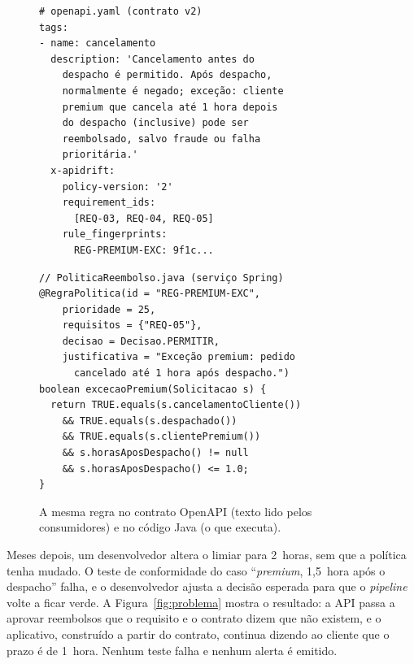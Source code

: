\documentclass[12pt]{article}
\begin{document}
\begin{figure}[!ht]
\centering
\begin{minipage}{0.48\linewidth}
\begin{lstlisting}
# openapi.yaml (contrato v2)
tags:
- name: cancelamento
  description: 'Cancelamento antes do
    despacho é permitido. Após despacho,
    normalmente é negado; exceção: cliente
    premium que cancela até 1 hora depois
    do despacho (inclusive) pode ser
    reembolsado, salvo fraude ou falha
    prioritária.'
  x-apidrift:
    policy-version: '2'
    requirement_ids:
      [REQ-03, REQ-04, REQ-05]
    rule_fingerprints:
      REG-PREMIUM-EXC: 9f1c...
\end{lstlisting}
\end{minipage}\hfill
\begin{minipage}{0.5\linewidth}
\begin{lstlisting}
// PoliticaReembolso.java (serviço Spring)
@RegraPolitica(id = "REG-PREMIUM-EXC",
    prioridade = 25,
    requisitos = {"REQ-05"},
    decisao = Decisao.PERMITIR,
    justificativa = "Exceção premium: pedido
      cancelado até 1 hora após despacho.")
boolean excecaoPremium(Solicitacao s) {
  return TRUE.equals(s.cancelamentoCliente())
    && TRUE.equals(s.despachado())
    && TRUE.equals(s.clientePremium())
    && s.horasAposDespacho() != null
    && s.horasAposDespacho() <= 1.0;
}
\end{lstlisting}
\end{minipage}
\caption{A mesma regra no contrato OpenAPI (texto lido pelos consumidores) e no código Java (o que executa).}
\label{fig:codigo}
\end{figure}

Meses depois, um desenvolvedor altera o limiar para 2~horas, sem que a política tenha mudado. O teste de conformidade do caso ``\textit{premium}, 1,5~hora após o despacho'' falha, e o desenvolvedor ajusta a decisão esperada para que o \textit{pipeline} volte a ficar verde. A Figura~\ref{fig:problema} mostra o resultado: a API passa a aprovar reembolsos que o requisito e o contrato dizem que não existem, e o aplicativo, construído a partir do contrato, continua dizendo ao cliente que o prazo é de 1~hora. Nenhum teste falha e nenhum alerta é emitido.
\end{document}
